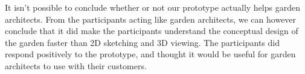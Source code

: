 It isn't possible to conclude whether or not our prototype actually helps garden architects. From the participants acting like garden architects, we can however conclude that it did make the participants understand the conceptual design of the garden faster than 2D sketching and 3D viewing. The participants did respond positively to the prototype, and thought it would be useful for garden architects to use with their customers.\\

